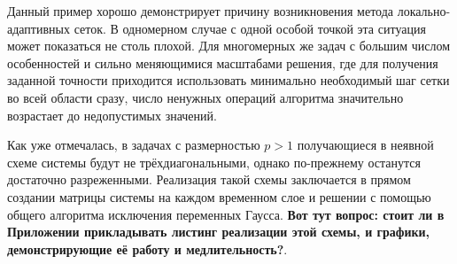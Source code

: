 Данный пример хорошо демонстрирует причину возникновения метода локально-адаптивных сеток.
В одномерном случае с одной особой точкой эта ситуация может показаться не столь плохой.
Для многомерных же задач с большим числом особенностей и сильно меняющимися масштабами решения, где для получения заданной точности приходится использовать минимально необходимый шаг сетки во всей области сразу, число ненужных операций алгоритма значительно возрастает до недопустимых значений. 

Как уже отмечалась, в задачах с размерностью $p > 1$ получающиеся в неявной схеме системы будут не трёхдиагональными, однако по-прежнему останутся достаточно разреженными.
Реализация такой схемы заключается в прямом создании матрицы системы на каждом временном слое и решении с помощью общего алгоритма исключения переменных Гаусса.
\textbf{Вот тут вопрос: стоит ли в Приложении прикладывать листинг реализации этой схемы, и графики, демонстрирующие её работу и медлительность?}.



